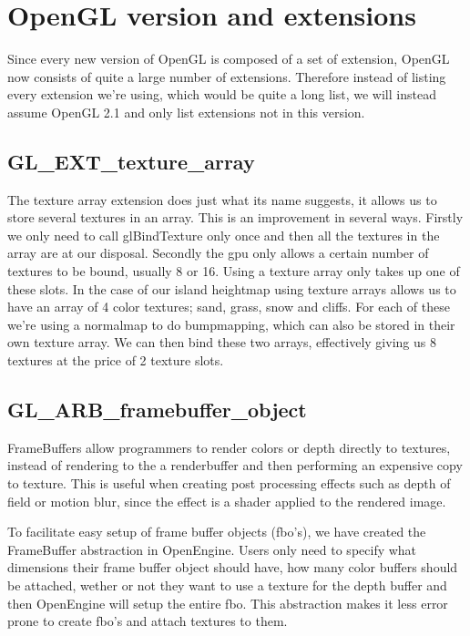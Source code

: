 \section{OpenGL version and extensions}

Since every new version of OpenGL is composed of a set of extension,
OpenGL now consists of quite a large number of extensions. Therefore
instead of listing every extension we're using, which would be quite a
long list, we will instead assume OpenGL 2.1 and only list extensions
not in this version.

\subsection{GL\_EXT\_texture\_array}

The texture array extension does just what its name suggests, it
allows us to store several textures in an array. This is an
improvement in several ways. Firstly we only need to call
glBindTexture only once and then all the textures in the array are at
our disposal. Secondly the gpu only allows a certain number of
textures to be bound, usually 8 or 16. Using a texture array only
takes up one of these slots. In the case of our island heightmap using
texture arrays allows us to have an array of 4 color textures; sand, grass, snow
and cliffs. For each of these we're using a normalmap to do
bumpmapping, which can also be stored in their own texture array. We
can then bind these two arrays, effectively giving us 8 textures at
the price of 2 texture slots.

\subsection{GL\_ARB\_framebuffer\_object}

FrameBuffers allow programmers to render colors or depth directly to
textures, instead of rendering to the a renderbuffer and then performing
an expensive copy to texture. This is useful when creating post
processing effects such as depth of field or motion blur, since the
effect is a shader applied to the rendered image.


To facilitate easy setup of frame buffer objects (fbo's), we have created the
FrameBuffer abstraction in OpenEngine. Users only need to specify what
dimensions their frame buffer object should have, how many color
buffers should be attached, wether or not they want to use a
texture for the depth buffer and then OpenEngine will setup the entire
fbo. This abstraction makes it less error prone to
create fbo's and attach textures to them.



